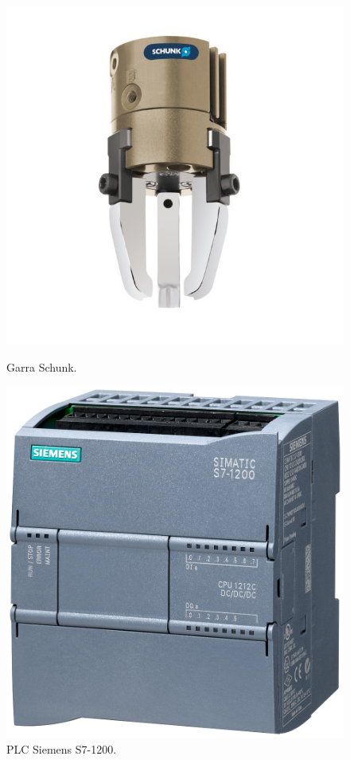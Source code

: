 \documentclass[12pt, a4paper]{article}
\begin{document}
\begin{figure}[h!]
    \centering
    \begin{minipage}{0.5\textwidth}
        \centering
        \includegraphics[width=\textwidth]{schunk.jpg}
        \caption{Garra Schunk.}
        \label{fig:schunk}
    \end{minipage}\hfill
    \begin{minipage}{0.4\textwidth}
        \centering
        \includegraphics[width=\textwidth]{S1200.png}
        \caption{PLC Siemens S7-1200.}
        \label{fig:plc}
    \end{minipage}
\end{figure}
\end{document}
